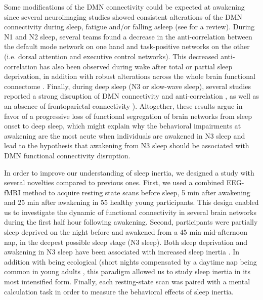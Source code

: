 Some modifications of the DMN connectivity could be expected at awakening since several neuroimaging studies showed consistent alterations of the DMN connectivity during sleep, fatigue and/or falling asleep (see \citet{picchioni_sleep_2013} for a review). During N1 and N2 sleep, several teams found a decrease in the anti-correlation between the default mode network on one hand and task-positive networks on the other (i.e. dorsal attention and executive control networks). This decreased anti-correlation has also been observed during wake after total or partial sleep deprivation, in addition with robust alterations across the whole brain functional connectome \citep{samann_increased_2010, de_havas_sleep_2012, yeo_functional_2015, kaufmann_brain_2015, tushaus_resisting_2017}. Finally, during deep sleep (N3 or slow-wave sleep), several studies reported a strong disruption of DMN connectivity and anti-correlation \citep{horovitz_decoupling_2009, larson-prior_modulation_2011, samann_development_2011}, as well as an absence of frontoparietal connectivity \citep{spoormaker_frontoparietal_2012}). Altogether, these results argue in favor of a progressive loss of functional segregation of brain networks from sleep onset to deep sleep, which might explain why the behavioral impairments at awakening are the most acute when individuals are awakened in N3 sleep and lead to the hypothesis that awakening from N3 sleep should be associated with DMN functional connectivity disruption.

In order to improve our understanding of sleep inertia, we designed a study with several novelties compared to previous ones. First, we used a combined EEG-fMRI method to acquire resting state scans before sleep, 5 min after awakening and 25 min after awakening in 55 healthy young participants. This design enabled us to investigate the dynamic of functional connectivity in several brain networks during the first half hour following awakening. Second, participants were partially sleep deprived on the night before and awakened from a 45 min mid-afternoon nap, in the deepest possible sleep stage (N3 sleep). Both sleep deprivation and awakening in N3 sleep have been associated with increased sleep inertia \citep{tassi_sleep_2000}. In addition with being ecological (short nights compensated by a daytime nap being common in young adults \citep{faraut_napping:_2016}, this paradigm allowed us to study sleep inertia in its most intensified form. Finally, each resting-state scan was paired with a mental calculation task in order to measure the behavioral effects of sleep inertia.

